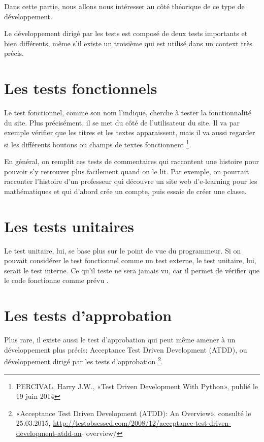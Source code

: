 \documentclass[a4paper,10pt,french]{sphinxmanual}
\begin{document}
Dans cette partie, nous allons nous intéresser au côté théorique de ce
type de développement.

Le développement dirigé par les tests est composé de deux tests importants et
bien différents, même s'il existe un troisième qui est utilisé dans un
context très précis.


\section{Les tests fonctionnels}
\label{tdd:les-tests-fonctionnels}
Le test fonctionnel, comme son nom l'indique, cherche à tester la fonctionnalité
du site. Plus précisément, il se met du côté de l'utilisateur du site. Il va par
exemple vérifier que les titres et les textes apparaissent, mais il va aussi
regarder si les différents boutons ou champs de textes fonctionnent \footnote{
PERCIVAL, Harry J.W., «Test Driven Development With Python», publié
le 19 juin 2014
}.

En général, on remplit ces tests de commentaires qui raccontent une histoire
pour pouvoir s'y retrouver plus facilement quand on le lit. Par exemple,
on pourrait racconter l'histoire d'un professeur qui découvre un site web
d'e-learning pour les mathématiques et qui d'abord crée un compte, puis
essaie de créer une classe.


\section{Les tests unitaires}
\label{tdd:les-tests-unitaires}
Le test unitaire, lui, se base plus sur le point de vue du programmeur. Si on
pouvait considérer le test fonctionnel comme un test externe, le test unitaire,
lui, serait le test interne. Ce qu'il teste ne sera jamais vu, car il permet de
vérifier que le code fonctionne comme prévu \footnotemark[1].


\section{Les tests d'approbation}
\label{tdd:les-tests-d-approbation}
Plus rare, il existe aussi le test d'approbation qui peut même amener à un
développement plus précis: Acceptance Test Driven Development (ATDD), ou
développement dirigé par les tests d'approbation \footnote{
«Acceptance Test Driven Development (ATDD): An Overview»,
consulté le 25.03.2015,
\href{http://testobsessed.com/2008/12/acceptance-test-driven-development-atdd-an}{http://testobsessed.com/2008/12/acceptance-test-driven-development-atdd-an}-
overview/
}.
\end{document}
